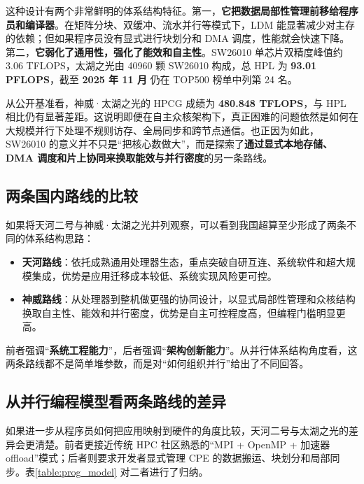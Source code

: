 \documentclass[a4paper]{article}
\begin{document}
这种设计有两个非常鲜明的体系结构特征。第一，\textbf{它把数据局部性管理前移给程序员和编译器}。在矩阵分块、双缓冲、流水并行等模式下，LDM 能显著减少对主存的依赖；但如果程序员没有显式进行块划分和 DMA 调度，性能就会快速下降。第二，\textbf{它弱化了通用性，强化了能效和自主性}。SW26010 单芯片双精度峰值约 3.06 TFLOPS，太湖之光由 40960 颗 SW26010 构成，总 HPL 为 \textbf{93.01 PFLOPS}，截至 \textbf{2025 年 11 月} 仍在 TOP500 榜单中列第 24 名\cite{sunway_taihulight,sunway_top500_2025}。

从公开基准看，神威·太湖之光的 HPCG 成绩为 \textbf{480.848 TFLOPS}，与 HPL 相比仍有显著差距\cite{sunway_top500_2025,hpcg_2017_11}。这说明即便在自主众核架构下，真正困难的问题依然是如何在大规模并行下处理不规则访存、全局同步和跨节点通信。也正因为如此，SW26010 的意义并不只是“把核心数做大”，而是探索了\textbf{通过显式本地存储、DMA 调度和片上协同来换取能效与并行密度}的另一条路线。

\subsection{两条国内路线的比较}
如果将天河二号与神威·太湖之光并列观察，可以看到我国超算至少形成了两条不同的体系结构思路：

\begin{itemize}
  \item \textbf{天河路线}：依托成熟通用处理器生态，重点突破自研互连、系统软件和超大规模集成，优势是应用迁移成本较低、系统实现风险更可控。
  \item \textbf{神威路线}：从处理器到整机做更强的协同设计，以显式局部性管理和众核结构换取自主性、能效和并行密度，优势是自主可控程度高，但编程门槛明显更高。
\end{itemize}

前者强调“\textbf{系统工程能力}”，后者强调“\textbf{架构创新能力}”。从并行体系结构角度看，这两条路线都不是简单堆参数，而是对“如何组织并行”给出了不同回答。

\subsection{从并行编程模型看两条路线的差异}
如果进一步从程序员如何把应用映射到硬件的角度比较，天河二号与太湖之光的差异会更清楚。前者更接近传统 HPC 社区熟悉的“MPI + OpenMP + 加速器 offload”模式；后者则要求开发者显式管理 CPE 的数据搬运、块划分和局部同步。表\ref{table:prog_model} 对二者进行了归纳。
\end{document}
